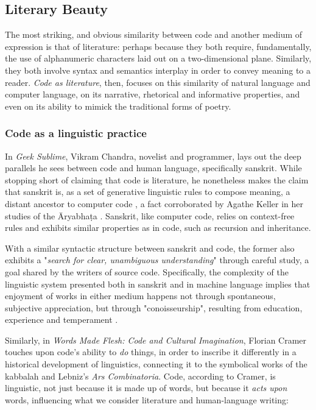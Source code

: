 \subsection{Literary Beauty}
\label{subsec:literary-beauty}

The most striking, and obvious similarity between code and another medium of expression is that of literature: perhaps because they both require, fundamentally, the use of alphanumeric characters laid out on a two-dimensional plane. Similarly, they both involve syntax and semantics interplay in order to convey meaning to a reader. \emph{Code as literature}, then, focuses on this similarity of natural language and computer language, on its narrative, rhetorical and informative properties, and even on its ability to mimick the traditional forms of poetry.

\subsubsection{Code as a linguistic practice}
\label{subsubsec:code-linguistic}

In \emph{Geek Sublime}, Vikram Chandra, novelist and programmer, lays out the deep parallels he sees between code and human language, specifically sanskrit. While stopping short of claiming that code is literature, he nonetheless makes the claim that sanskrit is, as a set of generative linguistic rules to compose meaning, a distant ancestor to computer code \citep{chandra_geek_2014}, a fact corroborated by Agathe Keller in her studies of the Āryabhaṭa \citep{keller_textes_2021}. Sanskrit, like computer code, relies on context-free rules and exhibits similar properties as in code, such as recursion and inheritance.

With a similar syntactic structure between sanskrit and code, the former also exhibits a "\emph{search for clear, unambiguous understanding}" through careful study, a goal shared by the writers of source code. Specifically, the complexity of the linguistic system presented both in sanskrit and in machine language implies that enjoyment of works in either medium happens not through spontaneous, subjective appreciation, but through "conoisseurship", resulting from education, experience and temperament \citep{chandra_geek_2014}.

Similarly, in \emph{Words Made Flesh: Code and Cultural Imagination}, Florian Cramer touches upon code's ability to \emph{do} things, in order to inscribe it differently in a historical development of linguistics, connecting it to the symbolical works of the kabbalah and Lebniz's \emph{Ars Combinatoria}. Code, according to Cramer, is linguistic, not just because it is made up of words, but because it \emph{acts upon} words, influencing what we consider literature and human-language writing:

